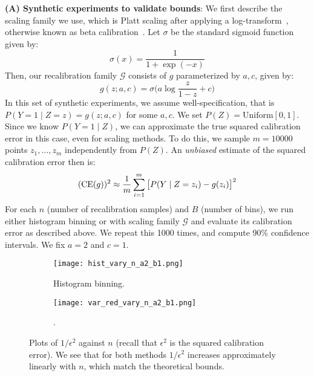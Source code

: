\textbf{(A) Synthetic experiments to validate bounds}: We first describe the scaling family we use, which is Platt scaling after applying a log-transform~\cite{platt1999probabilistic}, otherwise known as beta calibration~\cite{kull2017sigmoids}. Let $\sigma$ be the standard sigmoid function given by:
\[ \sigma(x) = \frac{1}{1 + \exp(-x)} \]
Then, our recalibration family $\mathcal{G}$ consists of $g$ parameterized by $a, c$, given by:
\[ g(z; a, c) = \sigma\Big( a\log{\frac{z}{1-z}} + c \Big) \]
In this set of synthetic experiments, we assume well-specification, that is $P(Y = 1 \mid Z=z) = g(z; a, c)$ for some $a, c$. We set $P(Z) = \mbox{Uniform}[0, 1]$. Since we know $P(Y = 1 \mid Z)$, we can approximate the true squared calibration error in this case, even for scaling methods. To do this, we sample $m=10000$ points $z_1, \dots, z_m$ independently from $P(Z)$. An \emph{unbiased} estimate of the squared calibration error then is:
\[ (\textup{CE}(g))^2 \approx \frac{1}{m} \sum_{i=1}^m \big[P(Y \mid Z = z_i) - g(z_i)\big]^2 \]
For each $n$ (number of recalibration samples) and $B$ (number of bins), we run either histogram binning or \ourcal{} with scaling family $\mathcal{G}$ and evaluate its calibration error as described above. We repeat this 1000 times, and compute 90\% confidence intervals. We fix $a = 2$ and $c = 1$.

\begin{figure}
  \centering
  \centering
     \begin{subfigure}[b]{0.48\textwidth}
         \centering
         \texttt{[image: hist\_vary\_n\_a2\_b1.png]}
         \caption{Histogram binning.
         }
         \label{fig:well-spec-vary-n-hist}
     \end{subfigure}
     \hfill
     \begin{subfigure}[b]{0.48\textwidth}
         \centering
         \texttt{[image: var\_red\_vary\_n\_a2\_b1.png]}
         \caption{\Ourcal{}.
         }
         \label{fig:well-spec-vary-n-var-red}
     \end{subfigure}
  \caption{
    Plots of $1/\epsilon^2$ against $n$ (recall that $\epsilon^2$ is the squared calibration error). We see that for both methods $1/\epsilon^2$ increases approximately linearly with $n$, which match the theoretical bounds.
}
  \label{fig:well-spec-vary-n}
\end{figure}

